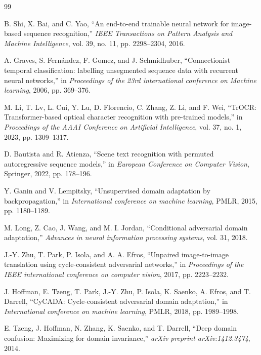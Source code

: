 \documentclass[11pt]{article}
\begin{document}
\begin{thebibliography}{99}

B. Shi, X. Bai, and C. Yao, ``An end-to-end trainable neural network for image-based sequence recognition,'' \textit{IEEE Transactions on Pattern Analysis and Machine Intelligence}, vol. 39, no. 11, pp. 2298--2304, 2016.

A. Graves, S. Fern{\'a}ndez, F. Gomez, and J. Schmidhuber, ``Connectionist temporal classification: labelling unsegmented sequence data with recurrent neural networks,'' in \textit{Proceedings of the 23rd international conference on Machine learning}, 2006, pp. 369--376.

M. Li, T. Lv, L. Cui, Y. Lu, D. Florencio, C. Zhang, Z. Li, and F. Wei, ``TrOCR: Transformer-based optical character recognition with pre-trained models,'' in \textit{Proceedings of the AAAI Conference on Artificial Intelligence}, vol. 37, no. 1, 2023, pp. 1309--1317.

D. Bautista and R. Atienza, ``Scene text recognition with permuted autoregressive sequence models,'' in \textit{European Conference on Computer Vision}, Springer, 2022, pp. 178--196.

Y. Ganin and V. Lempitsky, ``Unsupervised domain adaptation by backpropagation,'' in \textit{International conference on machine learning}, PMLR, 2015, pp. 1180--1189.

M. Long, Z. Cao, J. Wang, and M. I. Jordan, ``Conditional adversarial domain adaptation,'' \textit{Advances in neural information processing systems}, vol. 31, 2018.

J.-Y. Zhu, T. Park, P. Isola, and A. A. Efros, ``Unpaired image-to-image translation using cycle-consistent adversarial networks,'' in \textit{Proceedings of the IEEE international conference on computer vision}, 2017, pp. 2223--2232.

J. Hoffman, E. Tzeng, T. Park, J.-Y. Zhu, P. Isola, K. Saenko, A. Efros, and T. Darrell, ``CyCADA: Cycle-consistent adversarial domain adaptation,'' in \textit{International conference on machine learning}, PMLR, 2018, pp. 1989--1998.

E. Tzeng, J. Hoffman, N. Zhang, K. Saenko, and T. Darrell, ``Deep domain confusion: Maximizing for domain invariance,'' \textit{arXiv preprint arXiv:1412.3474}, 2014.


\end{thebibliography}
\end{document}
